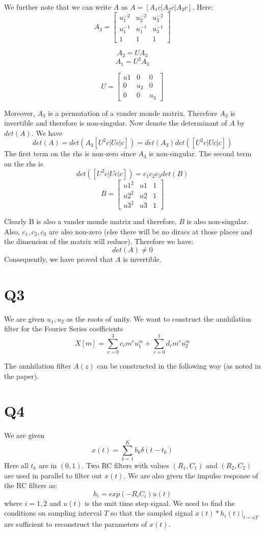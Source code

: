\documentclass{article}
\begin{document}
We further note that we can write $A$ as $A = [A_1c | A_2c | A_3c]$. Here:
$$A_3 = \begin{bmatrix}
u_1^{-2} & u_2^{-2} & u_3^{-2}\\
u_1^{-1} & u_1^{-1} & u_3^{-1}\\
 1 &  1 & 1
\end{bmatrix}$$

$$A_2 = UA_3$$
$$A_1 = U^2 A_3$$

$$U = \begin{bmatrix}
u1 & 0 & 0\\
0 & u_2 & 0\\
0 & 0 & u_3
\end{bmatrix}$$

Moreover, $A_3$ is a permutation of a vander monde matrix. Therefore $A_3$ is invertible and therefore is non-singular. Now denote the determinant of $A$ by $det(A)$. We have
$$det(A) = det(A_3 [U^2c | Uc | c]) = det(A_3) det([U^2c | Uc | c])$$
The first term on the rhs is non-zero since $A_3$ is non-singular. The second term on the rhs is
$$det([U^2c | Uc | c]) = c_1 c_2 c_3 det(B)$$
$$B = \begin{bmatrix}
u1^2 & u1 & 1\\
u2^2 & u2 & 1\\
u3^2 & u3 & 1
\end{bmatrix}$$

Clearly B is also a vander monde matrix and therefore, $B$ is also non-singular. Also, $c_1, c_2, c_3$ are also non-zero (else there will be no diracs at those places and the dimension of the matrix will reduce). Therefore we have:
$$det(A) \ne 0$$
Consequently, we have proved that $A$ is invertible.
\section*{Q3}
We are given $u_1, u_2$ as the roots of unity. We want to construct the annhilation filter for the Fourier Series coefficients $$X[m] = \sum_{r=0}^3 c_r m^r u_1^m + \sum_{r=0}^1 d_r m^r u_2^m$$

The annhilation filter $A(z)$ can be constructed in the following way (as noted in the paper).

\section*{Q4}
We are given
$$x(t) = \sum_{k=1}^K b_k \delta (t - t_k)$$
Here all $t_k$ are in $(0, 1)$. Two RC filters with values $(R_1,C_1)$ and $(R_2, C_2)$ are used in parallel to filter out $x(t)$. We are also given the impulse response of the RC filters as:
$$h_i = exp(-R_i C_i) u(t)$$
where $i = 1, 2$ and $u(t)$ is the unit time step signal. We need to find the conditions on sampling interval $T$ so that the sampled signal $x(t) * h_i(t)|_{t = nT}$ are sufficient to reconstruct the parameters of $x(t)$.
\end{document}

